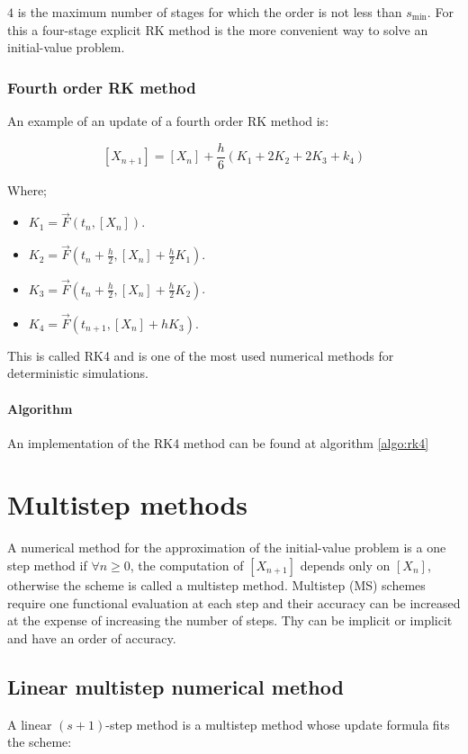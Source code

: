   $4$ is the maximum number of stages for which the order is not less than $s_{\min}$.
  For this a four-stage explicit RK method is the more convenient way to solve an initial-value problem.

    \subsubsection{Fourth order RK method}
    An example of an update of a fourth order RK method is:

    $$[X_{n+1}] = [X_n] +\frac{h}{6}(K_1+2K_2+2K_3+k_4)$$

    Where;

    \begin{multicols}{2}
      \begin{itemize}
        \item $K_1 = \vec{F}(t_n, [X_n])$.
        \item $K_2 = \vec{F}(t_n+ \frac{h}{2}, [X_n] + \frac{h}{2}K_1)$.
        \item $K_3 = \vec{F}(t_n +\frac{h}{2}, [X_n] + \frac{h}{2}K_2)$.
        \item $K_4 = \vec{F}(t_{n+1}, [X_n] + hK_3)$.
      \end{itemize}
    \end{multicols}

    This is called RK4 and is one of the most used numerical methods for deterministic simulations.

      \paragraph{Algorithm}
      An implementation of the RK4 method can be found at algorithm \ref{algo:rk4}

      

\section{Multistep methods}
A numerical method for the approximation of the initial-value problem is a one step method if $\forall n\ge 0$, the computation of $[X_{n+1}]$ depends only on $[X_n]$, otherwise the scheme is called a multistep method.
Multistep (MS) schemes require one functional evaluation at each step and their accuracy can be increased at the expense of increasing the number of steps.
Thy can be implicit or implicit and have an order of accuracy.

  \subsection{Linear multistep numerical method}
  A linear $(s+1)$-step method is a multistep method whose update formula fits the scheme:

